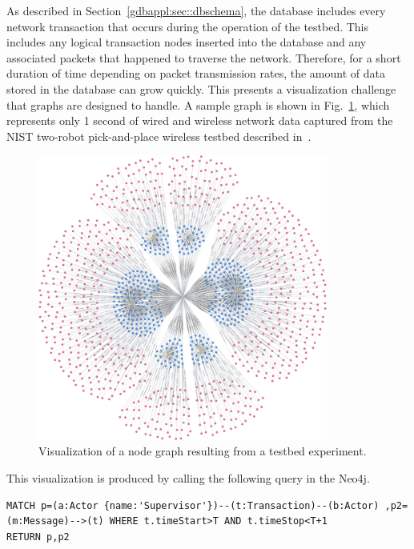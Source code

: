 As described in Section~\ref{gdbappl:sec::dbschema}, the database includes every network transaction that occurs during the operation of the testbed.  This includes any logical transaction nodes inserted into the database and any associated packets that happened to traverse the network.  Therefore, for a short duration of time depending on packet transmission rates, the amount of data stored in the database can grow quickly. This presents a visualization challenge that graphs are designed to handle. A sample graph is shown in Fig.~\ref{gdbappl:fig::Sample-graph_1}, which represents only 1 second of wired and wireless network data captured from the NIST two-robot pick-and-place wireless testbed described in~\cite{Liu2019vancouver}. 

\begin{figure}[!ht]
    \centering
   \includegraphics[width=0.85\textwidth]{./chapter-gdb-appl/figures/database/graph_M_T_2.png}
   \vspace{0.1in}
    \caption{ Visualization of a node graph resulting from a testbed experiment. }
    \label{gdbappl:fig::Sample-graph_1}
    \vspace{0.1in}
\end{figure}

This visualization is produced by calling the following query in the Neo4j. 
\begin{lstlisting}
MATCH p=(a:Actor {name:'Supervisor'})--(t:Transaction)--(b:Actor) ,p2=(m:Message)-->(t) WHERE t.timeStart>T AND t.timeStop<T+1
RETURN p,p2
\end{lstlisting}

